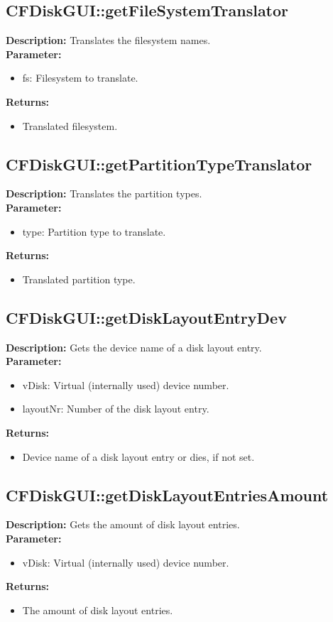 \subsection{CFDiskGUI::getFileSystemTranslator}
\textbf{Description:} Translates the filesystem names.\\
\textbf{Parameter:}
\begin{itemize}
\item fs: Filesystem to translate.
\end{itemize}
\textbf{Returns:}
\begin{itemize}
\item Translated filesystem.
\end{itemize}

\subsection{CFDiskGUI::getPartitionTypeTranslator}
\textbf{Description:} Translates the partition types.\\
\textbf{Parameter:}
\begin{itemize}
\item type: Partition type to translate.
\end{itemize}
\textbf{Returns:}
\begin{itemize}
\item Translated partition type.
\end{itemize}

\subsection{CFDiskGUI::getDiskLayoutEntryDev}
\textbf{Description:} Gets the device name of a disk layout entry.\\
\textbf{Parameter:}
\begin{itemize}
\item vDisk: Virtual (internally used) device number.
\item layoutNr: Number of the disk layout entry.
\end{itemize}
\textbf{Returns:}
\begin{itemize}
\item Device name of a disk layout entry or dies, if not set.
\end{itemize}

\subsection{CFDiskGUI::getDiskLayoutEntriesAmount}
\textbf{Description:} Gets the amount of disk layout entries.\\
\textbf{Parameter:}
\begin{itemize}
\item vDisk: Virtual (internally used) device number.
\end{itemize}
\textbf{Returns:}
\begin{itemize}
\item The amount of disk layout entries.
\end{itemize}

